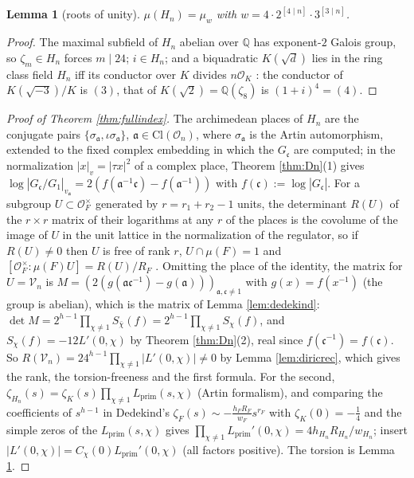 \documentclass[11pt]{amsart}
\numberwithin{equation}{section}
\theoremstyle{plain}
\newtheorem{lemma}[theorem]{Lemma}
\theoremstyle{definition}
\theoremstyle{remark}
\newcommand{\Q}{\mathbb{Q}}
\newcommand{\Cl}{\mathrm{Cl}}
\newcommand{\ideala}{\mathfrak{a}}
\newcommand{\idealc}{\mathfrak{c}}
\newcommand{\Lprim}{L_{\mathrm{prim}}}
\newcommand{\Oc}{\mathcal{O}}
\begin{document}
\begin{lemma}[roots of unity]\label{lem:torsion}
$\mu(H_n) = \mu_w$ with $w = 4\cdot2^{[4\mid n]}\cdot3^{[3\mid n]}$.
\end{lemma}

\begin{proof}
The maximal subfield of $H_n$ abelian over $\Q$ has exponent-$2$ Galois
group, so $\zeta_m \in H_n$ forces $m \mid 24$; $i \in H_n$; and a
biquadratic $K(\sqrt d)$ lies in the ring class field $H_n$ iff its
conductor over $K$ divides $n\Oc_K$ \cite[Thm.~9.18]{Cox2013}: the
conductor of $K(\sqrt{-3})/K$ is $(3)$, that of $K(\sqrt2) = \Q(\zeta_8)$
is $(1+i)^4 = (4)$.
\end{proof}

\begin{proof}[Proof of Theorem \ref{thm:fullindex}]
The archimedean places of $H_n$ are the conjugate pairs
$\{\sigma_\ideala, \iota\sigma_\ideala\}$, $\ideala \in \Cl(\Oc_n)$, where
$\sigma_\ideala$ is the Artin automorphism, extended to the fixed complex
embedding in which the $G_\idealc$ are computed; in the normalization
$|x|_v = |\tau x|^2$ of a complex place, Theorem \ref{thm:Dn}(1) gives
$\log|G_\idealc/G_1|_{v_\ideala} = 2(f(\ideala^{-1}\idealc) - f(\ideala^{-1}))$
with $f(\idealc) := \log|G_\idealc|$.  For a subgroup $U \subset \Oc_F^\times$
generated by $r = r_1 + r_2 - 1$ units, the determinant $R(U)$ of the
$r\times r$ matrix of their logarithms at any $r$ of the places is the
covolume of the image of $U$ in the unit lattice in the normalization of
the regulator, so if $R(U) \ne 0$ then $U$ is free of rank $r$, $U\cap\mu(F) = 1$
and $[\Oc_F^\times:\mu(F)U] = R(U)/R_F$ \cite[Lemma~4.15]{Washington1997}.
Omitting the place of the identity, the matrix for $U = \mathcal{V}_n$ is
$M = (2(g(\ideala\idealc^{-1}) - g(\ideala)))_{\ideala,\idealc\ne1}$ with
$g(x) = f(x^{-1})$ (the group is abelian), which is the matrix of Lemma
\ref{lem:dedekind}: $\det M = 2^{h-1}\prod_{\chi\ne1}S_{\bar\chi}(f) =
2^{h-1}\prod_{\chi\ne1}S_\chi(f)$, and $S_\chi(f) = -12L'(0,\chi)$ by
Theorem \ref{thm:Dn}(2), real since $f(\idealc^{-1}) = f(\idealc)$.  So
$R(\mathcal{V}_n) = 24^{h-1}\prod_{\chi\ne1}|L'(0,\chi)| \ne 0$ by Lemma
\ref{lem:diricrec}, which gives the rank, the torsion-freeness and the
first formula.  For the second, $\zeta_{H_n}(s) =
\zeta_K(s)\prod_{\chi\ne1}\Lprim(s,\chi)$ (Artin formalism), and comparing
the coefficients of $s^{h-1}$ in Dedekind's
$\zeta_F(s) \sim -\tfrac{h_FR_F}{w_F}s^{r_F}$ \cite[Cor.~VII.5.11]{Neukirch1999}
with $\zeta_K(0) = -\tfrac14$ and the simple zeros of the $\Lprim(s,\chi)$
gives $\prod_{\chi\ne1}\Lprim'(0,\chi) = 4h_{H_n}R_{H_n}/w_{H_n}$; insert
$|L'(0,\chi)| = C_\chi(0)\Lprim'(0,\chi)$ (all factors positive).  The
torsion is Lemma \ref{lem:torsion}.
\end{proof}
\end{document}
